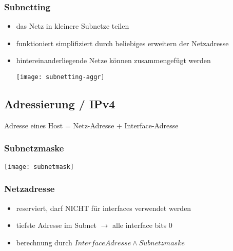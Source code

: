 \subsubsection{Subnetting}
\begin{itemize}
	\item das Netz in kleinere Subnetze teilen
	\item funktioniert simplifiziert durch beliebiges erweitern der Netzadresse
	\item hintereinanderliegende Netze können zusammengefügt werden
	      \begin{center}
		      \texttt{[image: subnetting-aggr]}
	      \end{center}
\end{itemize}








\subsection{Adressierung / IPv4}

Adresse eines Host = Netz-Adresse + Interface-Adresse

\subsubsection{Subnetzmaske}

\begin{center}
	\texttt{[image: subnetmask]}
\end{center}

\subsubsection{Netzadresse}

\begin{itemize}
	\item reserviert, darf NICHT für interfaces verwendet werden
	\item tiefste Adresse im Subnet $\rightarrow$ alle interface bits 0
	\item berechnung durch $Interface Adresse \land Subnetzmaske$
\end{itemize}

